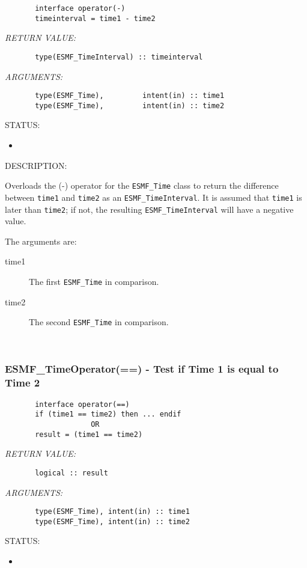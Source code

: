   
\begin{verbatim}       interface operator(-)
       timeinterval = time1 - time2      \end{verbatim}{\em RETURN VALUE:}
\begin{verbatim}       type(ESMF_TimeInterval) :: timeinterval
   \end{verbatim}{\em ARGUMENTS:}
\begin{verbatim}       type(ESMF_Time),         intent(in) :: time1
       type(ESMF_Time),         intent(in) :: time2\end{verbatim}
{\sf STATUS:}
   \begin{itemize}
   \item{}
   \end{itemize}
  
{\sf DESCRIPTION:\\ }


       Overloads the (-) operator for the {\tt ESMF\_Time} class to return the
       difference between {\tt time1} and {\tt time2} as an
       {\tt ESMF\_TimeInterval}.  It is assumed that {\tt time1} is later than
       {\tt time2}; if not, the resulting {\tt ESMF\_TimeInterval} will have a
       negative value.
  
       The arguments are:
       \begin{description}
       \item[time1]
            The first {\tt ESMF\_Time} in comparison.
       \item[time2]
            The second {\tt ESMF\_Time} in comparison.
       \end{description}
   
 
\mbox{}\hrulefill\ 
 
\subsubsection [ESMF\_TimeOperator(==)] {ESMF\_TimeOperator(==) - Test if Time 1 is equal to Time 2}


  
\begin{verbatim}       interface operator(==)
       if (time1 == time2) then ... endif
                    OR
       result = (time1 == time2)\end{verbatim}{\em RETURN VALUE:}
\begin{verbatim}       logical :: result\end{verbatim}{\em ARGUMENTS:}
\begin{verbatim}       type(ESMF_Time), intent(in) :: time1
       type(ESMF_Time), intent(in) :: time2\end{verbatim}
{\sf STATUS:}
   \begin{itemize}
   \item{}
   \end{itemize}
  
